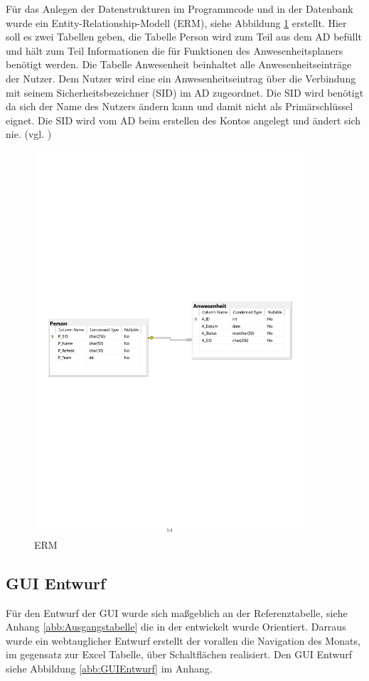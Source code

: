 Für das Anlegen der Datenstrukturen im Programmcode und in der Datenbank wurde ein Entity-Relationship-Modell (ERM), siehe Abbildung \ref{abb:ERM} erstellt. Hier soll es zwei Tabellen geben, die Tabelle Person wird zum Teil aus dem AD befüllt und hält zum Teil Informationen die für Funktionen des Anwesenheitsplaners benötigt werden. Die Tabelle Anwesenheit beinhaltet alle Anwesenheitseinträge der Nutzer. Dem Nutzer wird eine ein Anwesenheitseintrag über die Verbindung mit seinem Sicherheitsbezeichner (SID) im AD zugeordnet. Die SID wird benötigt da sich der Name des Nutzers ändern kann und damit nicht als Primärschlüssel eignet. Die SID wird vom AD beim erstellen des Kontos angelegt und ändert sich nie. (vgl. \cite{sid})

\begin{figure}[htbp]
    \centering
    \includegraphics[width=0.9\textwidth,angle=0]{abb/ERM.pdf}
    \caption[Beschreibung]{ERM}
    \label{abb:ERM}
\end{figure}

\subsection{GUI Entwurf}
\label{sec:GUI Entwurf}
Für den Entwurf der GUI wurde sich maßgeblich an der Referenztabelle, siehe Anhang \ref{abb:Ausgangstabelle} die in der  entwickelt wurde Orientiert. Darraus wurde ein webtauglicher Entwurf erstellt der vorallen die Navigation des Monats, im gegensatz zur Excel Tabelle, über Schaltflächen realisiert. Den GUI Entwurf siehe Abbildung \ref{abb:GUIEntwurf} im Anhang.

